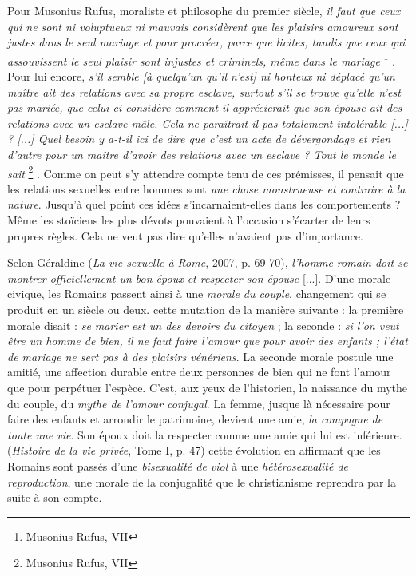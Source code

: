  Pour Musonius Rufus, moraliste et philosophe du premier siècle, {\emph{il faut que ceux qui ne sont ni voluptueux ni mauvais considèrent que les plaisirs amoureux sont justes dans le seul mariage et pour procréer, parce que licites, tandis que ceux qui assouvissent le seul plaisir sont injustes et criminels, même dans le mariage}%
\footnote{Musonius Rufus, VII}%
}. Pour lui encore, {\emph{s'il semble \emph{[à quelqu'un qu'il n'est]} ni honteux ni déplacé qu'un maître ait des relations avec sa propre esclave, surtout s'il se trouve qu'elle n'est pas mariée, que celui-ci considère comment il apprécierait que son épouse ait des relations avec un esclave mâle. Cela ne paraîtrait-il pas totalement intolérable \emph{[...]} ? \emph{[...]} Quel besoin y a-t-il ici de dire que c'est un acte de dévergondage et rien d'autre pour un maître d'avoir des relations avec un esclave ? Tout le monde le sait}%
\footnote{Musonius Rufus, VII}%
}. Comme on peut s'y attendre compte tenu de ces prémisses, il pensait que les relations sexuelles entre hommes sont {\emph{une chose monstrueuse et contraire à la nature}}. Jusqu'à quel point ces idées s'incarnaient-elles dans les comportements ? Même les stoïciens les plus dévots pouvaient à l'occasion s'écarter de leurs propres règles. Cela ne veut pas dire qu'elles n'avaient pas d'importance. 


 Selon Géraldine  (\emph{La vie sexuelle à Rome}, 2007, p. 69-70), {\emph{l'homme romain doit se montrer officiellement un bon époux et respecter son épouse} [...]}. D'une morale civique, les Romains passent ainsi à une {\emph{morale du couple}}, changement qui se produit en un siècle ou deux.  cette mutation de la manière suivante : la première morale disait : {\emph{se marier est un des devoirs du citoyen}} ; la seconde : {\emph{si l'on veut être un homme de bien, il ne faut faire l'amour que pour avoir des enfants ; l'état de mariage ne sert pas à des plaisirs vénériens}}. La seconde morale postule une amitié, une affection durable entre deux personnes de bien qui ne font l'amour que pour perpétuer l'espèce. C'est, aux yeux de l'historien, la naissance du mythe du couple, du {\emph{mythe de l'amour conjugal}}. La femme, jusque là nécessaire pour faire des enfants et arrondir le patrimoine, devient une amie, {\emph{la compagne de toute une vie}}. Son époux doit la respecter comme une amie qui lui est inférieure.  (\emph{Histoire de la vie privée}, Tome I, p. 47) cette évolution en affirmant que les Romains sont passés d'une {\emph{bisexualité de viol}} à une {\emph{hétérosexualité de reproduction}}, une morale de la conjugalité que le christianisme reprendra par la suite à son compte.

